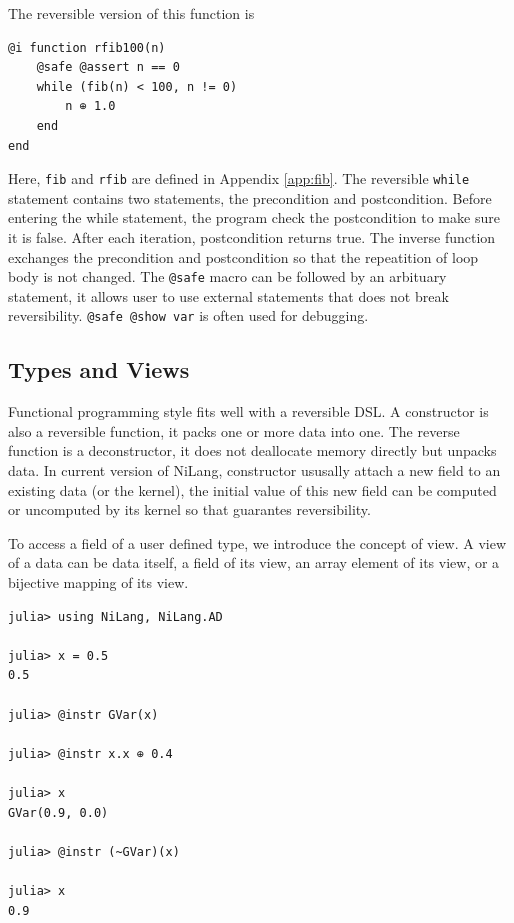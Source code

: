 \documentclass{article}
\newcommand{\<}{\langle}
\renewcommand{\>}{\rangle}
\newcommand{\App}[1]{Appendix \ref{#1}}
\begin{document}
The reversible version of this function is
\begin{minipage}{.44\textwidth}
\begin{lstlisting}
@i function rfib100(n)
    @safe @assert n == 0
    while (fib(n) < 100, n != 0)
        n ⊕ 1.0
    end
end
\end{lstlisting}
\end{minipage}

Here, \texttt{fib} and \texttt{rfib} are defined in \App{app:fib}.
The reversible \texttt{while} statement contains two statements, the precondition and postcondition.
Before entering the while statement, the program check the postcondition to make sure it is false.
After each iteration, postcondition returns true. The inverse function exchanges the precondition and postcondition so that the repeatition of loop body is not changed.
The \texttt{@safe} macro can be followed by an arbituary statement, it allows user to use external statements that does not break reversibility.
\texttt{@safe @show var} is often used for debugging.

\subsection{Types and Views}
Functional programming style fits well with a reversible DSL.
A constructor is also a reversible function, it packs one or more data into one.
The reverse function is a deconstructor, it does not deallocate memory directly but unpacks data.
In current version of NiLang, constructor ususally attach a new field to an existing data (or the kernel), the initial value of this new field can be computed or uncomputed by its kernel so that guarantes reversibility.

To access a field of a user defined type, we introduce the concept of view.
A view of a data can be data itself, a field of its view, an array element of its view, or a bijective mapping of its view.

\begin{minipage}{.44\textwidth}
\begin{lstlisting}
julia> using NiLang, NiLang.AD

julia> x = 0.5
0.5

julia> @instr GVar(x)

julia> @instr x.x ⊕ 0.4

julia> x
GVar(0.9, 0.0)

julia> @instr (~GVar)(x)

julia> x
0.9
\end{lstlisting}
\end{minipage}
\end{document}
